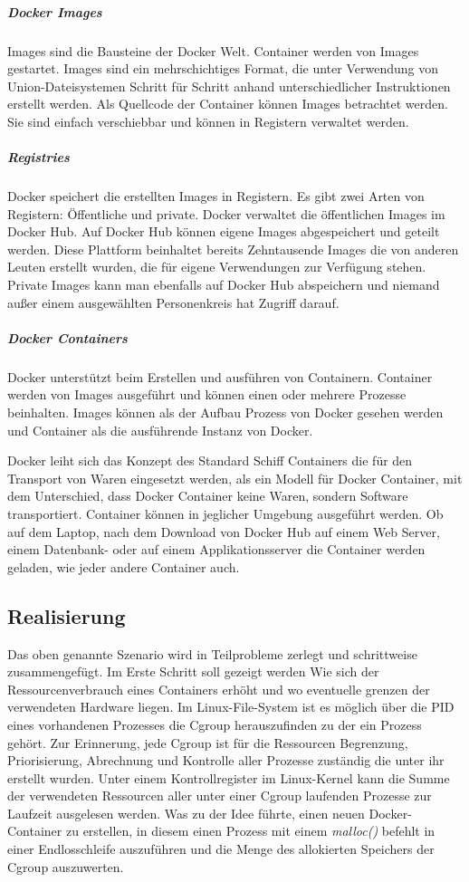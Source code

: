 \subparagraph{Docker Images}
Images sind die Bausteine der Docker Welt. Container werden von Images gestartet. Images sind ein mehrschichtiges Format, die unter Verwendung von Union-Dateisystemen Schritt für Schritt anhand unterschiedlicher Instruktionen erstellt werden. Als Quellcode der Container können Images betrachtet werden. Sie sind einfach verschiebbar und können in Registern verwaltet werden.

\subparagraph{Registries}
Docker speichert die erstellten Images in Registern. Es gibt zwei Arten von Registern: Öffentliche und private. Docker verwaltet die öffentlichen Images im Docker Hub\cite{DockerInc.2016DockerHub}. Auf Docker Hub können eigene Images abgespeichert und geteilt werden. Diese Plattform beinhaltet bereits Zehntausende Images die von anderen Leuten erstellt wurden, die für eigene Verwendungen zur Verfügung stehen. Private Images kann man ebenfalls auf Docker Hub abspeichern und niemand außer einem ausgewählten Personenkreis hat Zugriff darauf.

\subparagraph{Docker Containers}
Docker unterstützt beim Erstellen und ausführen von Containern. Container werden von Images ausgeführt und können einen oder mehrere Prozesse beinhalten. Images können als der Aufbau Prozess von Docker gesehen werden und Container als die ausführende Instanz von Docker.

Docker leiht sich das Konzept des Standard Schiff Containers die für den Transport von Waren eingesetzt werden, als ein Modell für Docker Container, mit dem Unterschied, dass Docker Container keine Waren, sondern Software transportiert. Container können in jeglicher Umgebung ausgeführt werden. Ob auf dem Laptop, nach dem Download von Docker Hub auf einem Web Server, einem Datenbank- oder auf einem Applikationsserver die Container werden geladen, wie jeder andere Container auch.

\pagebreak

\subsection{Realisierung}
Das oben genannte Szenario wird in Teilprobleme zerlegt und schrittweise zusammengefügt. Im Erste Schritt soll gezeigt werden Wie sich der Ressourcenverbrauch eines Containers erhöht und wo eventuelle grenzen der verwendeten Hardware liegen. Im Linux-File-System ist es möglich über die PID eines vorhandenen Prozesses die Cgroup herauszufinden zu der ein Prozess gehört. Zur Erinnerung, jede Cgroup ist für die Ressourcen Begrenzung, Priorisierung, Abrechnung und Kontrolle aller Prozesse zuständig die unter ihr erstellt wurden. Unter einem Kontrollregister im Linux-Kernel kann die Summe der verwendeten Ressourcen aller unter einer Cgroup laufenden Prozesse zur Laufzeit ausgelesen werden. Was zu der Idee führte, einen neuen Docker-Container zu erstellen, in diesem einen Prozess mit einem \emph{malloc()} befehlt in einer Endlosschleife auszuführen und die Menge des allokierten Speichers der Cgroup auszuwerten. 

